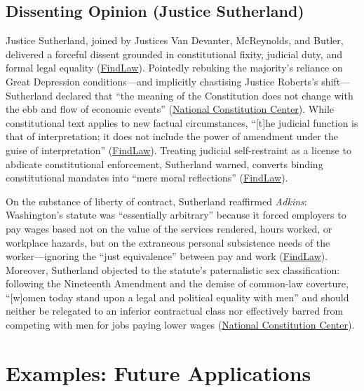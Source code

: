 \documentclass[12pt]{article}
\begin{document}
\subsection{Dissenting Opinion (Justice Sutherland)}

Justice Sutherland, joined by Justices Van Devanter, McReynolds, and Butler, delivered a forceful dissent grounded in constitutional fixity, judicial duty, and formal legal equality (\href{https://caselaw.findlaw.com/court/us-supreme-court/300/379.html}{FindLaw}). Pointedly rebuking the majority's reliance on Great Depression conditions---and implicitly chastising Justice Roberts's shift---Sutherland declared that ``the meaning of the Constitution does not change with the ebb and flow of economic events'' (\href{https://constitutioncenter.org/the-constitution/supreme-court-case-library/west-coast-hotel-co-v-parrish}{National Constitution Center}). While constitutional text applies to new factual circumstances, ``[t]he judicial function is that of interpretation; it does not include the power of amendment under the guise of interpretation'' (\href{https://caselaw.findlaw.com/court/us-supreme-court/300/379.html}{FindLaw}). Treating judicial self-restraint as a license to abdicate constitutional enforcement, Sutherland warned, converts binding constitutional mandates into ``mere moral reflections'' (\href{https://caselaw.findlaw.com/court/us-supreme-court/300/379.html}{FindLaw}).

On the substance of liberty of contract, Sutherland reaffirmed \textit{Adkins}: Washington's statute was ``essentially arbitrary'' because it forced employers to pay wages based not on the value of the services rendered, hours worked, or workplace hazards, but on the extraneous personal subsistence needs of the worker---ignoring the ``just equivalence'' between pay and work (\href{https://caselaw.findlaw.com/court/us-supreme-court/300/379.html}{FindLaw}). Moreover, Sutherland objected to the statute's paternalistic sex classification: following the Nineteenth Amendment and the demise of common-law coverture, ``[w]omen today stand upon a legal and political equality with men'' and should neither be relegated to an inferior contractual class nor effectively barred from competing with men for jobs paying lower wages (\href{https://constitutioncenter.org/the-constitution/supreme-court-case-library/west-coast-hotel-co-v-parrish}{National Constitution Center}).

\section{Examples: Future Applications}
\end{document}
